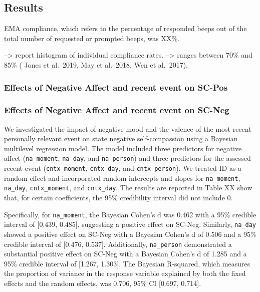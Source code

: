 \documentclass[
  man,floatsintext]{apa6}
\begin{document}
\hypertarget{results}{%
\subsection{Results}\label{results}}

EMA compliance, which refers to the percentage of responded beeps out of the total number of requested or prompted beeps, was XX\%.

--\textgreater{} report histogram of individual compliance rates.
--\textgreater{} ranges between 70\% and 85\% ( Jones et al.~2019, May et al.~2018, Wen et al.~2017).

\hypertarget{effects-of-negative-affect-and-recent-event-on-sc-pos}{%
\subsubsection{Effects of Negative Affect and recent event on SC-Pos}\label{effects-of-negative-affect-and-recent-event-on-sc-pos}}

\hypertarget{effects-of-negative-affect-and-recent-event-on-sc-neg}{%
\subsubsection{Effects of Negative Affect and recent event on SC-Neg}\label{effects-of-negative-affect-and-recent-event-on-sc-neg}}

We investigated the impact of negative mood and the valence of the most recent personally relevant event on state negative self-compassion using a Bayesian multilevel regression model. The model included three predictors for negative affect (\texttt{na\_moment}, \texttt{na\_day}, and \texttt{na\_person}) and three predictors for the assessed recent event (\texttt{cntx\_moment}, \texttt{cntx\_day}, and \texttt{cntx\_person}). We treated ID as a random effect and incorporated random intercepts and slopes for \texttt{na\_moment}, \texttt{na\_day}, \texttt{cntx\_moment}, and \texttt{cntx\_day}. The results are reported in Table XX show that, for certain coefficients, the 95\% credibility interval did not include 0.

Specifically, for \texttt{na\_moment}, the Bayesian Cohen's d was 0.462 with a 95\% credible interval of {[}0.439, 0.485{]}, suggesting a positive effect on SC-Neg. Similarly, \texttt{na\_day} showed a positive effect on SC-Neg with a Bayesian Cohen's d of 0.506 and a 95\% credible interval of {[}0.476, 0.537{]}. Additionally, \texttt{na\_person} demonstrated a substantial positive effect on SC-Neg with a Bayesian Cohen's d of 1.285 and a 95\% credible interval of {[}1.267, 1.303{]}. The Bayesian R-squared, which measures the proportion of variance in the response variable explained by both the fixed effects and the random effects, was 0.706, 95\% CI {[}0.697, 0.714{]}.
\end{document}
